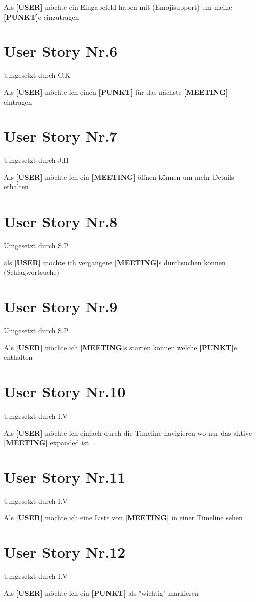 Als \textbf{[USER]} möchte ein Eingabefeld haben mit (Emojisupport) um meine \textbf{[PUNKT]}e einzutragen
\section{User Story Nr.6}
{\tiny{Umgesetzt durch C.K}} 

Als \textbf{[USER]} möchte ich einen \textbf{[PUNKT]} für das nächste \textbf{[MEETING]} eintragen
\section{User Story Nr.7}
{\tiny{Umgesetzt durch J.H}} 

Als \textbf{[USER]} möchte ich ein \textbf{[MEETING]} öffnen können um mehr Details erhalten
\section{User Story Nr.8}
{\tiny{Umgesetzt durch S.P}} 

als \textbf{[USER]} möchte ich vergangene \textbf{[MEETING]}s durchsuchen können (Schlagwortsuche)
\section{User Story Nr.9}
{\tiny{Umgesetzt durch S.P}} 

Als  \textbf{[USER]} möchte ich \textbf{[MEETING]}s starten können welche \textbf{[PUNKT]}e enthalten
\section{User Story Nr.10}
{\tiny{Umgesetzt durch I.V}} 

Als  \textbf{[USER]} möchte ich einfach durch die Timeline navigieren wo nur das aktive \textbf{[MEETING]} expanded ist
\section{User Story Nr.11}
{\tiny{Umgesetzt durch I.V}}

Als \textbf{[USER]} möchte ich eine Liste von \textbf{[MEETING]} in einer Timeline sehen

\section{User Story Nr.12}
{\tiny{Umgesetzt durch I.V}}

Als \textbf{[USER]} möchte ich ein  \textbf{[PUNKT]} als "wichtig" markieren